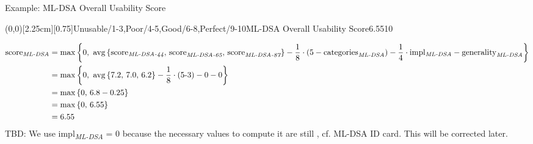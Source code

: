 \begin{algorithmbox}{Example: ML-DSA Overall Usability Score}
	\begin{minipage}[T]{0.25\textwidth}
		\GreenAbsoluteSpeedometer(0,0)[2.25cm][0.75]{Unusable/1-3,Poor/4-5,Good/6-8,Perfect/9-10}{ML-DSA Overall Usability Score}{6.55}{10}{\tiny}{\tiny \montserratsemibold}
	\end{minipage}
	\hfill
	\begin{minipage}[T]{0.75\textwidth}
	\vspace{-\baselineskip}
		\begin{align*}
			\textnormal{score\textsubscript{\itshape ML-DSA}} &= \max\left\{\textnormal{0, }\operatorname{avg}\left\{\textnormal{score}_\textnormal{\itshape ML-DSA-44}\textnormal{, score}_\textnormal{\itshape ML-DSA-65}\textnormal{, score}_\textnormal{\itshape ML-DSA-87}\right\} - \frac{\textnormal{1}}{\textnormal{8}}\cdot\left(\textnormal{5}-\textnormal{categories}_\textnormal{\itshape ML-DSA}\right) - \frac{\textnormal{1}}{\textnormal{4}}\cdot\textnormal{impl\textsubscript{\itshape ML-DSA}}- \textnormal{generality}_\textnormal{\itshape ML-DSA}\right\}\\
			&=\max\left\{\textnormal{0, }\operatorname{avg}\left\{\textnormal{7.2, 7.0, 6.2}\right\} - \frac{\textnormal{1}}{\textnormal{8}}\cdot\left(\textnormal{5-3}\right) - \textnormal{0} - \textnormal{0}\right\}\\
			&=\max\left\{\textnormal{0, }\textnormal{6.8} - \textnormal{0.25}\right\}\\
			&=\max\left\{\textnormal{0, }\textnormal{6.55}\right\}\\
			&=\textnormal{6.55}
		\end{align*}
	\textcolor{themeaccentsecondary}{TBD: We use \textnormal{impl\textsubscript{\itshape ML-DSA}} = 0 because the necessary values to compute it are still \tbd, cf. ML-DSA ID card. This will be corrected later.}\\
	\end{minipage}
\end{algorithmbox}
